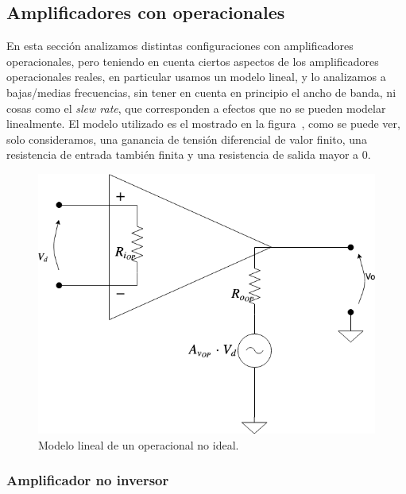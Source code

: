
\subsection{Amplificadores con operacionales}

\label{section:modelo_operacional}

En esta sección analizamos distintas configuraciones con amplificadores operacionales, pero teniendo en cuenta ciertos aspectos de los amplificadores operacionales reales, en particular usamos un modelo lineal, y lo analizamos a bajas/medias frecuencias, sin tener en cuenta en principio el ancho de banda, ni cosas como el \textit{slew rate}, que corresponden a efectos que no se pueden modelar linealmente. El modelo utilizado es el mostrado en la figura~, como se puede ver, solo consideramos, una ganancia de tensión diferencial de valor finito, una resistencia de entrada también finita y una resistencia de salida mayor a $0$.

\begin{figure}[H] %
\begin{center}
\includegraphics[width=1 \textwidth, angle=0]{./img/operacionales/OP_NONIDEAL_MODEL.png}
\caption{\label{fig:fig_operational_non_ideal}\footnotesize{Modelo lineal de un operacional no ideal.}}
\end{center}
\end{figure}

\vfill

\clearpage

\subsubsection{Amplificador no inversor}

